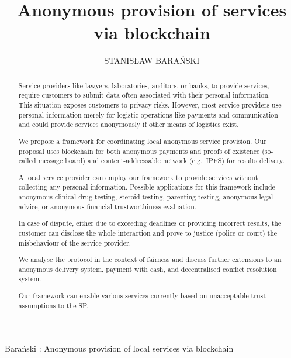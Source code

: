 \documentclass{ieeeaccess}
\begin{document}

\title{Anonymous provision of services via blockchain}
\author{\uppercase{Stanis\l{}aw Bara{\'n}ski}}

\address[1]{Department of Electronic, Telecommunication and Informatics, Gdansk University of Technology, Narutowicza 11/12 Gdansk Poland (e-mail: stanislaw.baranski@pg.edu.pl}


{Bara{\'n}ski : 
Anonymous provision of local services via blockchain}


\begin{abstract}
Service providers like lawyers, laboratories, auditors, or banks, to
provide services, require customers to submit data often
associated with their personal information. This situation exposes
customers to privacy risks. However, most service providers use personal information merely for logistic operations like payments
and communication and could provide services anonymously if other means of logistics exist.

We propose a framework for coordinating local anonymous service
provision. Our proposal uses blockchain for both anonymous payments and proofs of existence (so-called message board) and content-addressable network (e.g.~IPFS) for results delivery.

A local service provider can employ our framework to provide
services without collecting any personal information. Possible
applications for this framework include anonymous clinical drug testing,
steroid testing, parenting testing, anonymous legal advice, or
anonymous financial trustworthiness evaluation.

In case of dispute, either due to exceeding deadlines or providing
incorrect results, the customer can disclose the whole interaction and
prove to justice (police or court) the misbehaviour of the service
provider.

We analyse the protocol in the context of fairness and discuss further
extensions to an anonymous delivery system, payment with cash, and
decentralised conflict resolution system.

Our framework can enable various services currently based on unacceptable trust assumptions to the SP.
\end{abstract}
\end{document}
